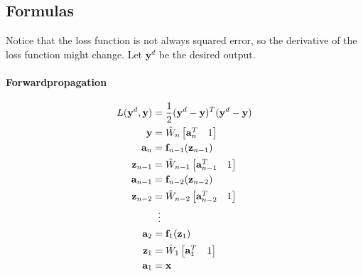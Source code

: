 \documentclass[a4paper, 11pt, accentcolor = tud3b]{tudreport}
\renewcommand{\vec}[1]{\mathbf{#1}}
\begin{document}
			\subsection{Formulas}
				Notice that the loss function is not always squared error, so the derivative of the loss function might change. Let \(\vec{y}^d\) be the desired output.
				
				\paragraph{Forwardpropagation}
					\begin{align}
						L(\vec{y}^d, \vec{y}) &= \frac{1}{2} (\vec{y}^d - \vec{y})^T (\vec{y}^d - \vec{y}) \\
						\vec{y} &= \hat{W}_n \begin{bmatrix} \vec{a}_n^T & 1 \end{bmatrix} \\
						\vec{a}_n &= \vec{f}_{n - 1} (\vec{z}_{n - 1}) \\
						\vec{z}_{n - 1} &= \hat{W}_{n - 1} \begin{bmatrix} \vec{a}_{n - 1}^T & 1 \end{bmatrix} \\
						\vec{a}_{n - 1} &= \vec{f}_{n - 2} (\vec{z}_{n - 2}) \\
						\vec{z}_{n - 2} &= \hat{W}_{n - 2} \begin{bmatrix} \vec{a}_{n - 2}^T & 1 \end{bmatrix} \\
						&\hspace{0.2cm}\vdots \\
						\vec{a}_2 &= \vec{f}_1(\vec{z}_1) \\
						\vec{z}_1 &= \hat{W}_1 \begin{bmatrix} \vec{a}_1^T & 1 \end{bmatrix} \\
						\vec{a}_1 &= \vec{x}
					\end{align}
				
\end{document}
